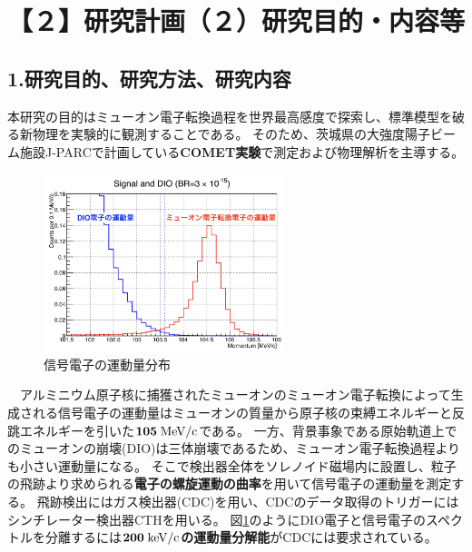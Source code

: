 \documentclass[11pt,a4j,dvipdfmx]{jarticle} 					%
\newcommand{\研究課題名}{ミューオン電子転換探索の感度向上に向けた解析手法の開発}
\newcommand{\研究機関名}{大阪大学}
\newcommand{\研究代表者氏名}{高見 翔太   }
\newcommand{\mysubsection}[1]{\vspace{-20pt}\subsection*{\colorbox{cyan!15}{\normalsize{#1}}}\vspace{-0.2cm}}
\begin{document}




\section{【２】研究計画（２）研究目的・内容等}
\mysubsection{1.研究目的、研究方法、研究内容}
本研究の目的はミューオン電子転換過程を世界最高感度で探索し、標準模型を破る新物理を実験的に観測することである。
そのため、茨城県の大強度陽子ビーム施設J-PARCで計画している\textbf{COMET実験}で測定および物理解析を主導する。\\
\begin{figure}{}
	\centering
	 \vspace{-1.2cm}
	 \hspace*{-15pt}
	 \includegraphics[width=7cm]{figs/momentum.png}
	 \vspace{-1.0cm}
	 \caption{\small{信号電子の運動量分布}}
	 \label{Fig:momentum}
	\end{figure} 
　アルミニウム原子核に捕獲されたミューオンのミューオン電子転換によって生成される信号電子の運動量はミューオンの質量から原子核の束縛エネルギーと反跳エネルギーを引いた$\mathbf{105\;\rm{MeV/c}}$である。
一方、背景事象である原始軌道上でのミューオンの崩壊(DIO)は三体崩壊であるため、ミューオン電子転換過程よりも小さい運動量になる。
そこで検出器全体をソレノイド磁場内に設置し、粒子の飛跡より求められる\textbf{電子の螺旋運動の曲率}を用いて信号電子の運動量を測定する。
飛跡検出にはガス検出器(CDC)を用い、CDCのデータ取得のトリガーにはシンチレーター検出器CTHを用いる。
図\ref{Fig:momentum}のようにDIO電子と信号電子のスペクトルを分離するには$\mathbf{200\;\rm{keV/c}}$\textbf{の運動量分解能}がCDCには要求されている。\\
\end{document}
